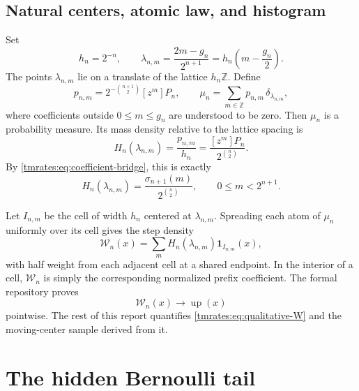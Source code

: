 \documentclass[11pt,oneside]{article}
\theoremstyle{definition}
\theoremstyle{remark}
\newcommand{\Z}{\mathbb Z}
\newcommand{\Up}{\operatorname{up}}
\begin{document}
\subsection{Natural centers, atomic law, and histogram}

Set
\begin{equation}
 h_n=2^{-n},
 \qquad
 \lambda_{n,m}=\frac{2m-g_n}{2^{n+1}}
 =h_n\left(m-\frac{g_n}{2}\right).                        \label{tmrates:eq:center}
\end{equation}
The points $\lambda_{n,m}$ lie on a translate of the lattice $h_n\Z$.  Define
\begin{equation}
 p_{n,m}=2^{-\binom{n+1}{2}}[z^m]P_n,
 \qquad
 \mu_n=\sum_{m\in\Z}p_{n,m}\,\delta_{\lambda_{n,m}},    \label{tmrates:eq:atomic-law}
\end{equation}
where coefficients outside $0\le m\le g_n$ are understood to be zero.  Then $\mu_n$ is a
probability measure.  Its mass density relative to the lattice spacing is
\begin{equation}
 H_n(\lambda_{n,m})=\frac{p_{n,m}}{h_n}
 =\frac{[z^m]P_n}{2^{\binom n2}}.                          \label{tmrates:eq:Hn}
\end{equation}
By \eqref{tmrates:eq:coefficient-bridge}, this is exactly
\begin{equation}
 H_n(\lambda_{n,m})
 =\frac{\sigma_{n+1}(m)}{2^{\binom n2}},
 \qquad 0\le m<2^{n+1}.                                  \label{tmrates:eq:Hn-prefix}
\end{equation}

Let $I_{n,m}$ be the cell of width $h_n$ centered at $\lambda_{n,m}$.  Spreading each atom of
$\mu_n$ uniformly over its cell gives the step density
\begin{equation}
 \mathcal W_n(x)=\sum_m H_n(\lambda_{n,m})\mathbf 1_{I_{n,m}}(x), \label{tmrates:eq:Wn}
\end{equation}
with half weight from each adjacent cell at a shared endpoint.  In the interior of a cell,
$\mathcal W_n$ is simply the corresponding normalized prefix coefficient.  The formal
repository proves
\begin{equation}
 \mathcal W_n(x)\longrightarrow\Up(x)                     \label{tmrates:eq:qualitative-W}
\end{equation}
pointwise.  The rest of this report quantifies \eqref{tmrates:eq:qualitative-W} and the moving-center
sample derived from it.

\section{The hidden Bernoulli tail}
\label{tmrates:sec:tail}
\end{document}
